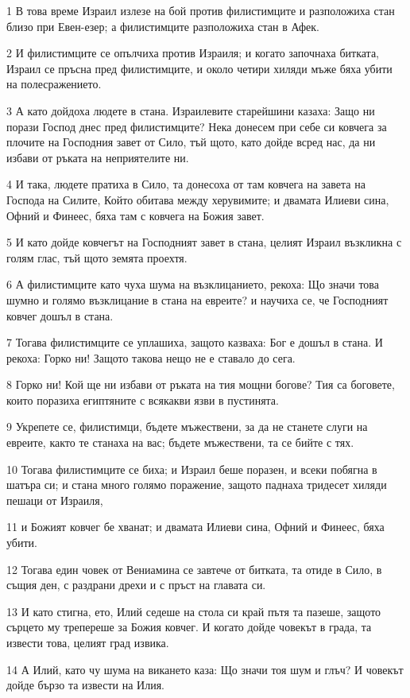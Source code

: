\par 1 В това време Израил излезе на бой против филистимците и разположиха стан близо при Евен-езер; а филистимците разположиха стан в Афек.
\par 2 И филистимците се опълчиха против Израиля; и когато започнаха битката, Израил се пръсна пред филистимците, и около четири хиляди мъже бяха убити на полесражението.
\par 3 А като дойдоха людете в стана. Израилевите старейшини казаха: Защо ни порази Господ днес пред филистимците? Нека донесем при себе си ковчега за плочите на Господния завет от Сило, тъй щото, като дойде всред нас, да ни избави от ръката на неприятелите ни.
\par 4 И така, людете пратиха в Сило, та донесоха от там ковчега на завета на Господа на Силите, Който обитава между херувимите; и двамата Илиеви сина, Офний и Финеес, бяха там с ковчега на Божия завет.
\par 5 И като дойде ковчегът на Господният завет в стана, целият Израил възкликна с голям глас, тъй щото земята проехтя.
\par 6 А филистимците като чуха шума на възклицанието, рекоха: Що значи това шумно и голямо възклицание в стана на евреите? и научиха се, че Господният ковчег дошъл в стана.
\par 7 Тогава филистимците се уплашиха, защото казваха: Бог е дошъл в стана. И рекоха: Горко ни! Защото такова нещо не е ставало до сега.
\par 8 Горко ни! Кой ще ни избави от ръката на тия мощни богове? Тия са боговете, които поразиха египтяните с всякакви язви в пустинята.
\par 9 Укрепете се, филистимци, бъдете мъжествени, за да не станете слуги на евреите, както те станаха на вас; бъдете мъжествени, та се бийте с тях.
\par 10 Тогава филистимците се биха; и Израил беше поразен, и всеки побягна в шатъра си; и стана много голямо поражение, защото паднаха тридесет хиляди пешаци от Израиля,
\par 11 и Божият ковчег бе хванат; и двамата Илиеви сина, Офний и Финеес, бяха убити.
\par 12 Тогава един човек от Вениамина се завтече от битката, та отиде в Сило, в същия ден, с раздрани дрехи и с пръст на главата си.
\par 13 И като стигна, ето, Илий седеше на стола си край пътя та пазеше, защото сърцето му трепереше за Божия ковчег. И когато дойде човекът в града, та извести това, целият град извика.
\par 14 А Илий, като чу шума на викането каза: Що значи тоя шум и глъч? И човекът дойде бързо та извести на Илия.
